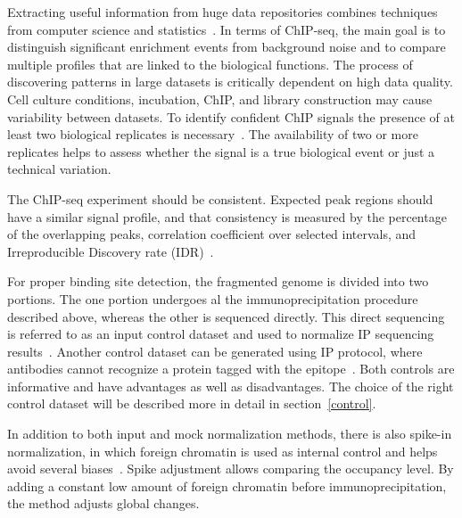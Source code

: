 Extracting useful information from huge data repositories combines techniques from computer science and statistics~\cite{friedman2001elements}. 
In terms of ChIP-seq, the main goal is to distinguish significant enrichment events from background noise and to compare multiple profiles that are linked to the biological functions. 
The process of discovering patterns in large datasets is critically dependent on high data quality. 
Cell culture conditions, incubation, ChIP, and library construction may cause variability between datasets. 
To identify confident ChIP signals the presence of at least two biological replicates is necessary~\cite{kidder2011chip}. 
The availability of two or more replicates helps to assess whether the signal is a true biological event or just a technical variation. 

The ChIP-seq experiment should be consistent. 
Expected peak regions should have a similar signal profile, and that consistency is measured by the percentage of the overlapping peaks, correlation coefficient over selected intervals, and Irreproducible Discovery rate (IDR)~\cite{shin2013computational}.

For proper binding site detection, the fragmented genome is divided into two portions. 
The one portion undergoes al the immunoprecipitation procedure described above, whereas the other is sequenced directly. 
This direct sequencing is referred to as an input control dataset and used to normalize IP sequencing results~\cite{kidder2011chip}. 
Another control dataset can be generated using IP protocol, where antibodies cannot recognize a protein tagged with the epitope~\cite{flensburg2014comparison}. 
Both controls are informative and have advantages as well as disadvantages.
The choice of the right control dataset will be described more in detail in section~\ref{control}.

In addition to both input and mock normalization methods, there is also spike-in normalization, in which foreign chromatin is used as internal control and helps avoid several biases~\cite{bonhoure2014quantifying}.
Spike adjustment allows comparing the occupancy level. 
By adding a constant low amount of foreign chromatin before immunoprecipitation, the method adjusts global changes. 